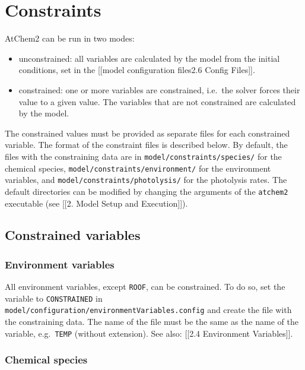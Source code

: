 \section{Constraints} \label{sec:constraints}

AtChem2 can be run in two modes:

\begin{itemize}
\item
  unconstrained: all variables are calculated by the model from the
  initial conditions, set in the {[}{[}model configuration
  files\textbar{}2.6 Config Files{]}{]}.
\item
  constrained: one or more variables are constrained, i.e.~the solver
  forces their value to a given value. The variables that are not
  constrained are calculated by the model.
\end{itemize}

The constrained values must be provided as separate files for each
constrained variable. The format of the constraint files is described
below. By default, the files with the constraining data are in
\texttt{model/constraints/species/} for the chemical species,
\texttt{model/constraints/environment/} for the environment variables,
and \texttt{model/constraints/photolysis/} for the photolysis rates. The
default directories can be modified by changing the arguments of the
\texttt{atchem2} executable (see {[}{[}2. Model Setup and
Execution{]}{]}).

\subsection{Constrained variables}\label{constrained-variables}

\subsubsection{Environment variables}\label{environment-variables}

All environment variables, except \texttt{ROOF}, can be constrained. To
do so, set the variable to \texttt{CONSTRAINED} in
\texttt{model/configuration/environmentVariables.config} and create the
file with the constraining data. The name of the file must be the same
as the name of the variable, e.g.~\texttt{TEMP} (without extension). See
also: {[}{[}2.4 Environment Variables{]}{]}.

\subsubsection{Chemical species}\label{chemical-species}

